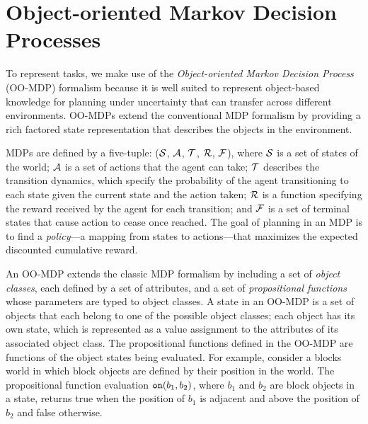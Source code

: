 \documentclass[conference]{IEEEtran}
\begin{document}


\section{Object-oriented Markov Decision Processes}
To represent tasks, we make use of the {\em Object-oriented Markov Decision Process} (OO-MDP) formalism \cite{diuk08b} because it is well suited to represent object-based knowledge for planning under uncertainty that can transfer across different environments. OO-MDPs extend the conventional MDP formalism by providing a rich factored state representation that describes the objects in the environment. 

MDPs are defined by a five-tuple: (${\cal S}$, ${\cal A}$, ${\cal T}$, ${\cal R}$, ${\cal F}$), where ${\cal S}$ is a set of states of the world; ${\cal A}$ is a set of actions that the agent can take; ${\cal T}$ describes the transition dynamics, which specify the probability of the agent transitioning to each state given the current state and the action taken; ${\cal R}$ is a function specifying the reward received by the agent for each transition; and ${\cal F}$ is a set of terminal states that cause action to cease once reached. The goal of planning in an MDP is to find a {\em policy}---a mapping from states to actions---that maximizes the expected discounted cumulative reward.

An OO-MDP extends the classic MDP formalism by including a set of {\em object classes}, each defined by a set of attributes, and a set of \emph{propositional functions} whose parameters are typed to object classes. A state in an OO-MDP is a set of objects that each belong to one of the possible object classes; each object has its own state, which is represented as a value assignment to the attributes of its associated object class. The propositional functions defined in the OO-MDP are functions of the object states being evaluated. For example, consider a blocks world in which block objects are defined by their position in the world. The propositional function evaluation ${\tt on}(b_1, b_2)$, where $b_1$ and $b_2$ are block objects in a state, returns {\sf true} when the position of $b_1$ is adjacent and above the position of $b_2$ and {\sf false} otherwise. 
\end{document}
